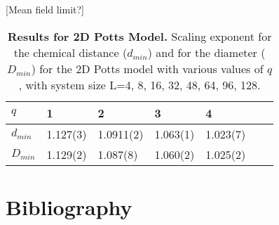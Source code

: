 \documentclass[pre,preprint]{revtex4}
\begin{document}



[Mean field limit?]


\begin{table}[h]
\begin{center}
\begin{tabular}{| l | l | l | l | l | l | l |}
\hline
$q$ & 1 & 2 & 3 & 4 \\
\hline
$d_{min}$ & 1.127(3) & 1.0911(2) & 1.063(1) & 1.023(7) \\
\hline
$D_{min}$ & 1.129(2) & 1.087(8) & 1.060(2) & 1.025(2) \\

\hline
\end{tabular}
\caption{\label{tab:dminD2d} {\bf Results for 2D Potts Model.} Scaling exponent for the chemical distance ($d_{min}$) and for the diameter ($D_{min}$) for the 2D Potts model with various values of $q$, with system size L=4, 8, 16, 32, 48, 64, 96, 128.}
\end{center}
\end{table}




\section{Bibliography}

{}
\end{document}
